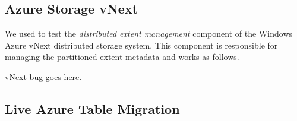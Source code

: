 \subsection{Azure Storage vNext}
\label{sec:cases:azurestore}




We used \psharp to test the \emph{distributed extent management} component of the Windows Azure vNext distributed storage system. This component is responsible for managing the partitioned extent metadata and works as follows.

vNext bug goes here.

\subsection{Live Azure Table Migration}
\label{sec:cases:migration}

